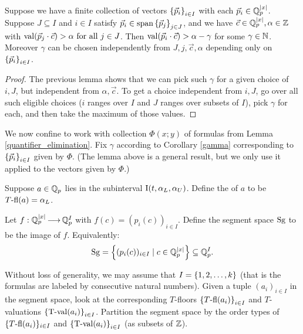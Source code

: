 \documentclass{amsart}
\begin{document}
\begin{Corollary}	 \label{gamma}
  Suppose we have a finite collection of vectors $\left\{\vec p_i\right\}_{i \in I}$ with each $\vec p_i \in \mathbb{Q}_p^{|x|}$.
  Suppose $J \subseteq I$ and $i \in I$ satisfy $\vec p_i \in \operatorname{span} \left\{\vec p_j\right\}_{j \in J}$,
  and we have $\vec c \in \mathbb{Q}_p^{|x|}, \alpha \in \mathbb{Z}$ with $\operatorname{val}(\vec p_j \cdot \vec c) > \alpha \text{ for all } j \in J$.
  Then $\operatorname{val}(\vec p_i \cdot \vec c) > \alpha - \gamma$
  for some $\gamma \in \mathbb{N}$.
  Moreover $\gamma$ can be chosen independently from $J, j, \vec c, \alpha$ depending only on $\left\{\vec p_i\right\}_{i \in I}$.
\end{Corollary}
\begin{proof}
  The previous lemma shows that we can pick such $\gamma$ for a given choice of $i, J$, but independent from $\alpha, \vec c$.
  To get a choice independent from $i, J$, go over all such eligible choices 
  ($i$ ranges over $I$ and $J$ ranges over subsets of $I$),
  pick $\gamma$ for each, and then take the maximum of those values.  
\end{proof}

We now confine to work with collection $\Phi(x; y)$ of formulas from Lemma \ref{quantifier_elimination}.
Fix $\gamma$ according to Corollary \ref{gamma} corresponding to $\left\{\vec p_i\right\}_{i \in I}$ given by $\Phi$.
(The lemma above is a general result, but we only use it applied to the vectors given by $\Phi$.)

\begin{Definition}
  Suppose $a \in \mathbb{Q}_p$ lies in the subinterval $\operatorname{I}(t, \alpha_L, \alpha_U)$.
  Define the  of $a$ to be $T{\operatorname{-fl}}(a) = \alpha_L$.
\end{Definition}

\begin{Definition}
  Let $f: \mathbb{Q}_p^{|x|} \operatorname{\longrightarrow} \mathbb{Q}_p^I$ with $f(c) = (p_i(c))_{i \in I}$.
  Define the segment space $\operatorname{Sg}$ to be the image of $f$.
  Equivalently:
  \begin{align*}
    \operatorname{Sg} = \left\{(p_i(c))_{i \in I} \mid c \in \mathbb{Q}_p^{|x|}\right\} \subseteq \mathbb{Q}_p^I.
  \end{align*}
\end{Definition}

Without loss of generality, we may assume that $I = \left\{1,2, \ldots, k\right\}$ (that is the formulas are labeled by consecutive natural numbers).
Given a tuple $(a_i)_{i\in I}$ in the segment space,
look at the corresponding $T$-floors $\left\{T{\operatorname{-fl}}(a_i)\right\}_{i\in I}$ and $T$-valuations $\left\{\operatorname{T-val}(a_i)\right\}_{i\in I}$.
Partition the segment space by the order types of $\{T{\operatorname{-fl}}(a_i)\}_{i\in I}$ and $\left\{\operatorname{T-val}(a_i)\right\}_{i\in I}$ (as subsets of $\mathbb{Z}$).
\end{document}

